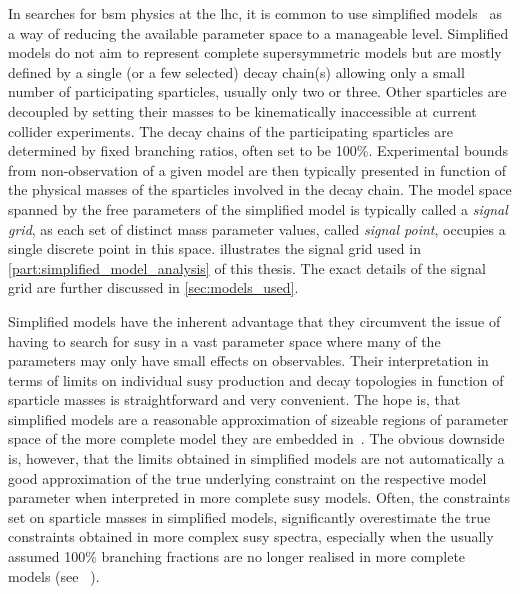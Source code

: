In searches for \gls{bsm} physics at the \gls{lhc}, it is common to use simplified models~\cite{SimplifiedModels1:2008ag,SimplifiedModels2:2011wf,Alves:2011sq} as a way of reducing the available parameter space to a manageable level.
Simplified models do not aim to represent complete supersymmetric models but are mostly defined by a single (or a few selected) decay chain(s) allowing only a small number of participating sparticles, usually only two or three.
Other sparticles are decoupled by setting their masses to be kinematically inaccessible at current collider experiments. The decay chains of the participating sparticles are determined by fixed branching ratios, often set to be 100\%.
Experimental bounds from non-observation of a given model are then typically presented in function of the physical masses of the sparticles involved in the decay chain.
The model space spanned by the free parameters of the simplified model is typically called a \textit{signal grid}, as each set of distinct mass parameter values, called \textit{signal point}, occupies a single discrete point in this space.  illustrates the signal grid used in \cref{part:simplified_model_analysis} of this thesis. The exact details of the signal grid are further discussed in \cref{sec:models_used}.
 
Simplified models have the inherent advantage that they circumvent the issue of having to search for \gls{susy} in a vast parameter space where many of the parameters may only have small effects on observables. Their interpretation in terms of limits on individual \gls{susy} production and decay topologies in function of sparticle masses is straightforward and very convenient.
The hope is, that simplified models are a reasonable approximation of sizeable regions of parameter space of the more complete model they are embedded in~\cite{pdg2020}. The obvious downside is, however, that the limits obtained in simplified models are not automatically a good approximation of the true underlying constraint on the respective model parameter when interpreted in more complete \gls{susy} models.
Often, the constraints set on sparticle masses in simplified models, significantly overestimate the true constraints obtained in more complex \gls{susy} spectra, especially when the usually assumed 100\% branching fractions are no longer realised in more complete models (see \eg~\cite{Ambrogi:2017lov,Buchmueller:2013exa}).

